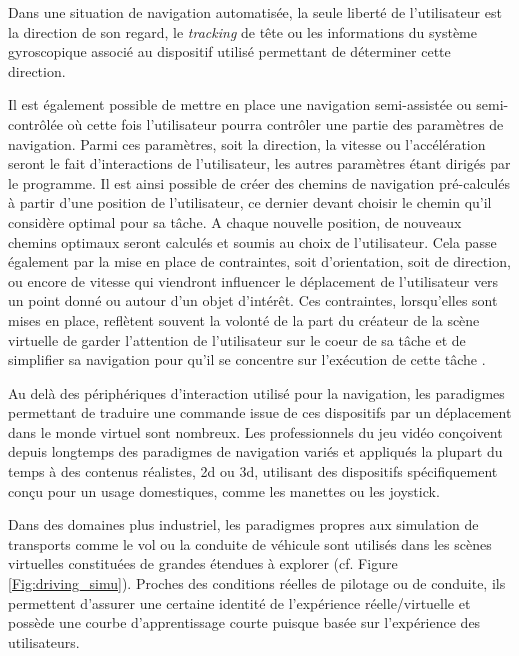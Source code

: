 Dans une situation de navigation automatisée, la seule liberté de l'utilisateur est la direction de son regard, le \textit{tracking} de tête ou les informations du système gyroscopique associé au dispositif utilisé permettant de déterminer cette direction.

Il est également possible de mettre en place une navigation semi-assistée ou semi-contrôlée où cette fois l'utilisateur pourra contrôler une partie des paramètres de navigation. Parmi ces paramètres, soit la direction, la vitesse ou l'accélération seront le fait d'interactions de l'utilisateur, les autres paramètres étant dirigés par le programme. Il est ainsi possible de créer des chemins de navigation pré-calculés à partir d'une position de l'utilisateur, ce dernier devant choisir le chemin qu'il considère optimal pour sa tâche. A chaque nouvelle position, de nouveaux chemins optimaux seront calculés et soumis au choix de l'utilisateur.
Cela passe également par la mise en place de contraintes, soit d'orientation, soit de direction, ou encore de vitesse qui viendront influencer le déplacement de l'utilisateur vers un point donné ou autour d'un objet d'intérêt. Ces contraintes, lorsqu'elles sont mises en place, reflètent souvent la volonté de la part du créateur de la scène virtuelle de garder l'attention de l'utilisateur sur le coeur de sa tâche et de simplifier sa navigation pour qu'il se concentre sur l’exécution de cette tâche \cite{salomon2003interactive}.


Au delà des périphériques d'interaction utilisé pour la navigation, les paradigmes permettant de traduire une commande issue de ces dispositifs par un déplacement dans le monde virtuel sont nombreux. Les professionnels du jeu vidéo conçoivent depuis longtemps des paradigmes de navigation variés et appliqués la plupart du temps à des contenus réalistes, 2d ou 3d, utilisant des dispositifs spécifiquement conçu pour un usage domestiques, comme les manettes ou les joystick.

Dans des domaines plus industriel, les paradigmes propres aux simulation de transports comme le vol ou la conduite de véhicule sont utilisés dans les scènes virtuelles constituées de grandes étendues à explorer (cf. Figure \ref{Fig:driving_simu}). Proches des conditions réelles de pilotage ou de conduite, ils permettent d'assurer une certaine identité de l'expérience réelle/virtuelle et possède une courbe d'apprentissage courte puisque basée sur l'expérience des utilisateurs.

